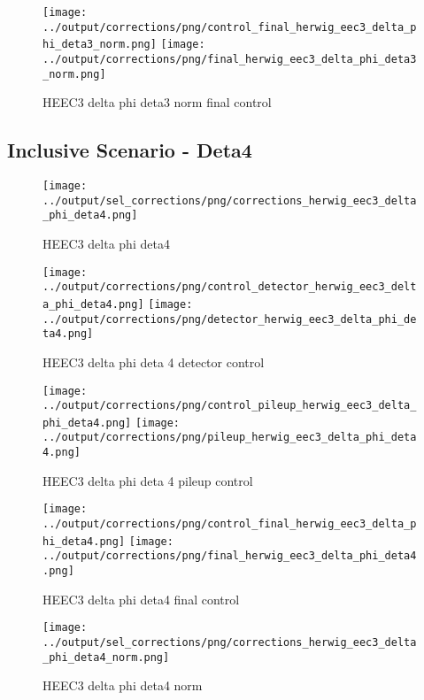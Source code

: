 \documentclass[11pt]{book}
\begin{document}
\begin{figure}[ht]
\centering
\texttt{[image: ../output/corrections/png/control\_final\_herwig\_eec3\_delta\_phi\_deta3\_norm.png]}
\texttt{[image: ../output/corrections/png/final\_herwig\_eec3\_delta\_phi\_deta3\_norm.png]}
\caption{HEEC3 delta phi deta3 norm final control}
\label{fig:HEEC3_delta_phi_deta3_norm_final_control}
\end{figure}


\clearpage
\subsection{Inclusive Scenario - Deta4}
\begin{figure}[ht]
\centering
\texttt{[image: ../output/sel\_corrections/png/corrections\_herwig\_eec3\_delta\_phi\_deta4.png]}
\caption{HEEC3 delta phi deta4}
\label{fig:HEEC3_delta_phi_deta4}
\end{figure}


\begin{figure}[ht]
\centering
\texttt{[image: ../output/corrections/png/control\_detector\_herwig\_eec3\_delta\_phi\_deta4.png]}
\texttt{[image: ../output/corrections/png/detector\_herwig\_eec3\_delta\_phi\_deta4.png]}
\caption{HEEC3 delta phi deta 4 detector control}
\label{fig:HEEC3_delta_phi_deta4_detector_control}
\end{figure}

\begin{figure}[ht]
\centering
\texttt{[image: ../output/corrections/png/control\_pileup\_herwig\_eec3\_delta\_phi\_deta4.png]}
\texttt{[image: ../output/corrections/png/pileup\_herwig\_eec3\_delta\_phi\_deta4.png]}
\caption{HEEC3 delta phi deta 4 pileup control}
\label{fig:HEEC3_delta_phi_deta4_pileup_control}
\end{figure}


\begin{figure}[ht]
\centering
\texttt{[image: ../output/corrections/png/control\_final\_herwig\_eec3\_delta\_phi\_deta4.png]}
\texttt{[image: ../output/corrections/png/final\_herwig\_eec3\_delta\_phi\_deta4.png]}
\caption{HEEC3 delta phi deta4 final control}
\label{fig:HEEC3_delta_phi_deta4_final_control}
\end{figure}


\begin{figure}[ht]
\centering
\texttt{[image: ../output/sel\_corrections/png/corrections\_herwig\_eec3\_delta\_phi\_deta4\_norm.png]}
\caption{HEEC3 delta phi deta4 norm}
\label{fig:HEEC3_delta_phi_deta4_norm}
\end{figure}
\end{document}
